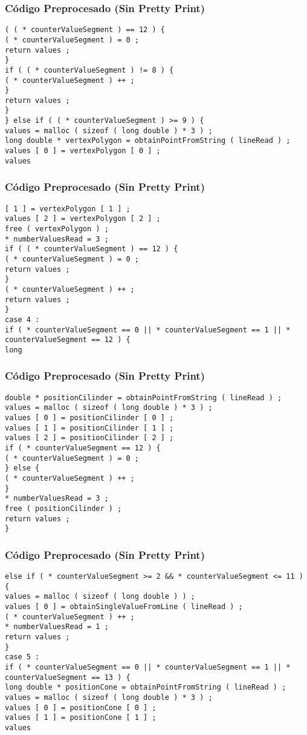 \documentclass{beamer}
\begin{document}
\begin{frame}[fragile]
\frametitle{C\'odigo Preprocesado (Sin Pretty Print)}
\begin{lstlisting}[style=CStyle]
( ( * counterValueSegment ) == 12 ) { 
( * counterValueSegment ) = 0 ; 
return values ; 
} 
if ( ( * counterValueSegment ) != 8 ) { 
( * counterValueSegment ) ++ ; 
} 
return values ; 
} 
} else if ( ( * counterValueSegment ) >= 9 ) { 
values = malloc ( sizeof ( long double ) * 3 ) ; 
long double * vertexPolygon = obtainPointFromString ( lineRead ) ; 
values [ 0 ] = vertexPolygon [ 0 ] ; 
values \end{lstlisting}
\end{frame}
\begin{frame}[fragile]
\frametitle{C\'odigo Preprocesado (Sin Pretty Print)}
\begin{lstlisting}[style=CStyle]
[ 1 ] = vertexPolygon [ 1 ] ; 
values [ 2 ] = vertexPolygon [ 2 ] ; 
free ( vertexPolygon ) ; 
* numberValuesRead = 3 ; 
if ( ( * counterValueSegment ) == 12 ) { 
( * counterValueSegment ) = 0 ; 
return values ; 
} 
( * counterValueSegment ) ++ ; 
return values ; 
} 
case 4 : 
if ( * counterValueSegment == 0 || * counterValueSegment == 1 || * counterValueSegment == 12 ) { 
long \end{lstlisting}
\end{frame}
\begin{frame}[fragile]
\frametitle{C\'odigo Preprocesado (Sin Pretty Print)}
\begin{lstlisting}[style=CStyle]
double * positionCilinder = obtainPointFromString ( lineRead ) ; 
values = malloc ( sizeof ( long double ) * 3 ) ; 
values [ 0 ] = positionCilinder [ 0 ] ; 
values [ 1 ] = positionCilinder [ 1 ] ; 
values [ 2 ] = positionCilinder [ 2 ] ; 
if ( * counterValueSegment == 12 ) { 
( * counterValueSegment ) = 0 ; 
} else { 
( * counterValueSegment ) ++ ; 
} 
* numberValuesRead = 3 ; 
free ( positionCilinder ) ; 
return values ; 
} \end{lstlisting}
\end{frame}
\begin{frame}[fragile]
\frametitle{C\'odigo Preprocesado (Sin Pretty Print)}
\begin{lstlisting}[style=CStyle]
else if ( * counterValueSegment >= 2 && * counterValueSegment <= 11 ) { 
values = malloc ( sizeof ( long double ) ) ; 
values [ 0 ] = obtainSingleValueFromLine ( lineRead ) ; 
( * counterValueSegment ) ++ ; 
* numberValuesRead = 1 ; 
return values ; 
} 
case 5 : 
if ( * counterValueSegment == 0 || * counterValueSegment == 1 || * counterValueSegment == 13 ) { 
long double * positionCone = obtainPointFromString ( lineRead ) ; 
values = malloc ( sizeof ( long double ) * 3 ) ; 
values [ 0 ] = positionCone [ 0 ] ; 
values [ 1 ] = positionCone [ 1 ] ; 
values \end{lstlisting}
\end{frame}
\end{document}
